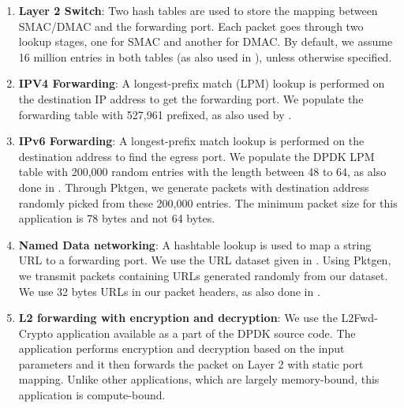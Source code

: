 \begin{enumerate}
\item \textbf{Layer 2 Switch}: Two hash tables are used to store the mapping between SMAC/DMAC and the forwarding port. Each packet goes through two lookup stages, one for SMAC and another for DMAC. By default, we assume 16 million entries in both tables (as also used in \cite{189006}), unless otherwise specified.
\item \textbf{IPV4 Forwarding}: A longest-prefix match (LPM) lookup is performed on the destination IP address to get the forwarding port.
We populate the forwarding table with 527,961 prefixed, as also used by \cite{189006}.
\item \textbf{IPv6 Forwarding}: A longest-prefix match lookup is performed on the destination address to find the egress port. We populate the DPDK LPM table with 200,000 random entries with the length between 48 to 64, as also done in \cite{189006}. Through Pktgen, we generate packets with destination address randomly picked from these 200,000 entries. The minimum packet size for this application is 78 bytes and not 64 bytes.
\item \textbf{Named Data networking}: A hashtable lookup is used to map a string URL to a forwarding port.
We use the URL dataset given in \cite{DBLP:conf/globecom/ZhangWYLL13}. Using Pktgen, we transmit packets containing URLs generated randomly from our dataset. We use 32 bytes URLs in our packet headers, as also done in \cite{189006}.
\item \textbf{L2 forwarding with encryption and decryption}: We use the L2Fwd-Crypto\cite{l2crypto} application available as a part of the DPDK source code. The application performs encryption and decryption based on the input parameters and it then forwards the packet on Layer 2 with static port mapping. Unlike other applications, which are largely memory-bound, this application is compute-bound.
\end{enumerate}

